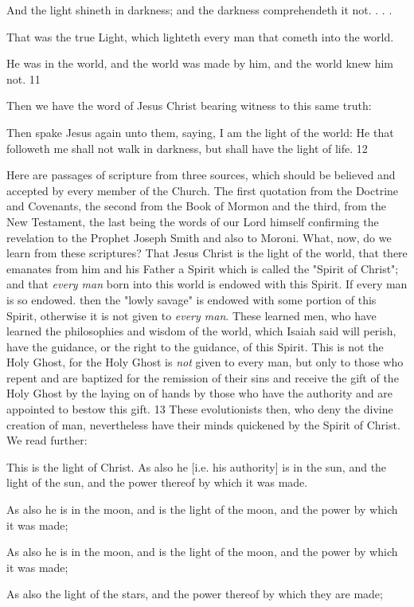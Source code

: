 And the light shineth in darkness; and the darkness comprehendeth it not. . . .

That was the true Light, which lighteth every man that cometh into the world.

He was in the world, and the world was made by him, and the world knew him not. 11

Then we have the word of Jesus Christ bearing witness to this same truth:

Then spake Jesus again unto them, saying, I am the light of the world: He that followeth me
shall not walk in darkness, but shall have the light of life. 12

Here are passages of scripture from three sources, which should be believed and accepted by
every member of the Church. The first quotation from the Doctrine and Covenants, the
second from the Book of Mormon and the third, from the New Testament, the last being the
words of our Lord himself confirming the revelation to the Prophet Joseph Smith and also to
Moroni. What, now, do we learn from these scriptures? That Jesus Christ is the light of the
world, that there emanates from him and his Father a Spirit which is called the "Spirit of
Christ"; and that \textit{every man} born into this world is endowed with this Spirit. If every man is
so endowed. then the "lowly savage" is endowed with some portion of this Spirit, otherwise
it is not given to \textit{every man}. These learned men, who have learned the philosophies and
wisdom of the world, which Isaiah said will perish, have the guidance, or the right to the
guidance, of this Spirit. This is not the Holy Ghost, for the Holy Ghost is \textit{not} given to every
man, but only to those who repent and are baptized for the remission of their sins and receive
the gift of the Holy Ghost by the laying on of hands by those who have the authority and are
appointed to bestow this gift. 13 These evolutionists then, who deny the divine creation of
man, nevertheless have their minds quickened by the Spirit of Christ. We read further:

This is the light of Christ. As also he [i.e. his authority] is in the sun, and the light of the sun,
and the power thereof by which it was made.

As also he is in the moon, and is the light of the moon, and the power by which it was made;

As also he is in the moon, and is the light of the moon, and the power by which it was made;

As also the light of the stars, and the power thereof by which they are made;

